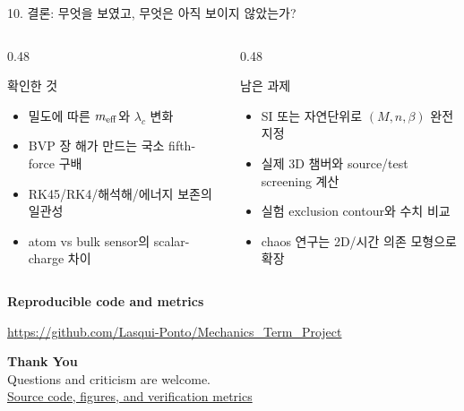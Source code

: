 \documentclass[10pt,aspectratio=169]{beamer}
\begin{document}
\begin{frame}{10. 결론: 무엇을 보였고, 무엇은 아직 보이지 않았는가?}
 \begin{columns}[T]
  \begin{column}{0.48\textwidth}
   \begin{block}{확인한 것}
    \begin{itemize}
     \item 밀도에 따른 $m_{\rm eff}$와 $\lambda_c$ 변화
     \item BVP 장 해가 만드는 국소 fifth-force 구배
     \item RK45/RK4/해석해/에너지 보존의 일관성
     \item atom vs bulk sensor의 scalar-charge 차이
    \end{itemize}
   \end{block}
  \end{column}
  \begin{column}{0.48\textwidth}
   \begin{alertblock}{남은 과제}
    \begin{itemize}
     \item SI 또는 자연단위로 $(M,n,\beta)$ 완전 지정
     \item 실제 3D 챔버와 source/test screening 계산
     \item 실험 exclusion contour와 수치 비교
     \item chaos 연구는 2D/시간 의존 모형으로 확장
    \end{itemize}
   \end{alertblock}
  \end{column}
 \end{columns}
 \vspace{0.35cm}
 \centering
 \textcolor{TealAccent}{\Large\bfseries Reproducible code and metrics}\par
 \href{https://github.com/Lasqui-Ponto/Mechanics_Term_Project}{https://github.com/Lasqui-Ponto/Mechanics\_Term\_Project}
\end{frame}

\begin{frame}[plain]
 \begin{center}
  \color{NavyDark}
  \vspace{1.2cm}
  \Huge\textbf{Thank You}\\[0.8cm]
  \large Questions and criticism are welcome.\\[0.5cm]
  \small\href{https://github.com/Lasqui-Ponto/Mechanics_Term_Project}{Source code, figures, and verification metrics}
 \end{center}
\end{frame}
\end{document}
